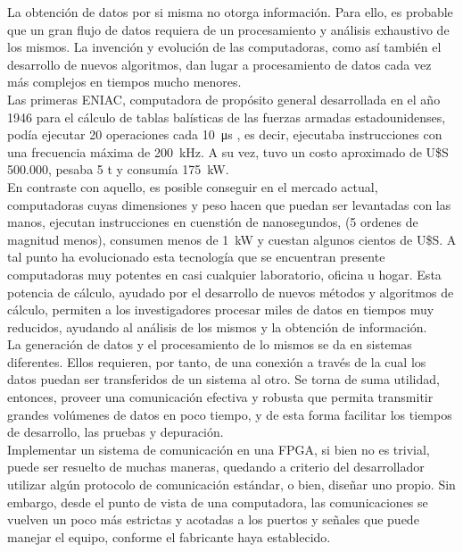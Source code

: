 La obtención de datos por si misma no otorga información. Para ello, es probable que un gran flujo de datos requiera de un procesamiento y análisis exhaustivo de los mismos. La invención y evolución de las computadoras, como así también el desarrollo de nuevos algoritmos, dan lugar a procesamiento de datos cada vez más complejos en tiempos mucho menores.\\

Las primeras ENIAC, computadora de propósito general desarrollada en el año 1946 para el cálculo de tablas balísticas de las fuerzas armadas estadounidenses, podía ejecutar 20 operaciones cada \SI{10}{\micro\second} \cite{Goldstine1946}, es decir, ejecutaba instrucciones con una frecuencia máxima de \SI{200}{\kilo\hertz}. A su vez, tuvo un costo aproximado de U\$S 500.000, pesaba 5 t y consumía \SI{175}{\kilo\watt}.\\

En contraste con aquello, es posible conseguir en el mercado actual, computadoras cuyas dimensiones y peso hacen que puedan ser levantadas con las manos, ejecutan instrucciones en cuenstión de nanosegundos, (5 ordenes de magnitud menos), consumen menos de \SI{1}{\kilo\watt} y cuestan algunos cientos de U\$S. A tal punto ha evolucionado esta tecnología que se encuentran presente computadoras muy potentes en casi cualquier laboratorio, oficina u hogar. Esta potencia de cálculo, ayudado por el desarrollo de nuevos métodos y algoritmos de cálculo, permiten a los investigadores procesar miles de datos en tiempos muy reducidos, ayudando al análisis de los mismos y la obtención de información.\\

La generación de datos y el procesamiento de lo mismos se da en sistemas diferentes. Ellos requieren, por tanto, de una conexión a través de la cual los datos puedan ser transferidos de un sistema al otro. Se torna de suma utilidad, entonces, proveer una comunicación efectiva y robusta que permita transmitir grandes volúmenes de datos en poco tiempo, y de esta forma facilitar los tiempos de desarrollo, las pruebas y depuración.\\

Implementar un sistema de comunicación en una FPGA, si bien no es trivial, puede ser resuelto de muchas maneras, quedando a criterio del desarrollador utilizar algún protocolo de comunicación estándar, o bien, diseñar uno propio. Sin embargo, desde el punto de vista de una computadora, las comunicaciones se vuelven un poco más estrictas y acotadas a los puertos y señales que puede manejar el equipo, conforme el fabricante haya establecido.\\


